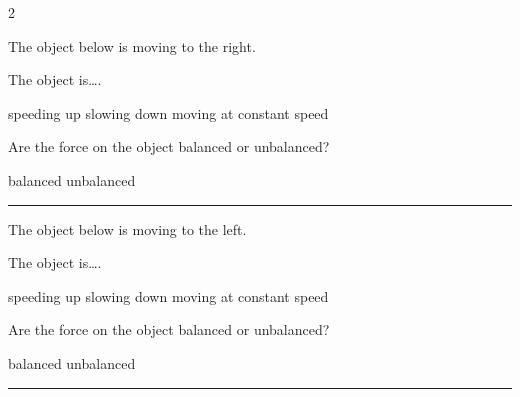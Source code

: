 \documentclass[answers]{exam}
\begin{document}
\begin{questions}
\begin{multicols*}{2}


\question \label{T7nyj}
The object below is moving to the right.

\begin{center}
\end{center}

The object is\dots .

\begin{randomizechoices}[norandomize]
    \choice speeding up
    \choice slowing down
    \correctchoice moving at constant speed 
\end{randomizechoices}

\question \label{lUN3c}
Are the force on the object balanced or unbalanced?

\begin{randomizechoices}[norandomize]
    \correctchoice balanced
    \choice unbalanced
\end{randomizechoices}

\bigskip
\hrule

\question \label{CrTRg}
The object below is moving to the left.


\begin{center}
\end{center}

The object is\dots .

\begin{randomizechoices}[norandomize]
    \choice speeding up
    \correctchoice slowing down
    \choice moving at constant speed 
\end{randomizechoices}

\question \label{TzyfS}
Are the force on the object balanced or unbalanced?

\begin{randomizechoices}[norandomize]
    \choice balanced
    \correctchoice unbalanced
\end{randomizechoices}

\bigskip
\hrule



\end{multicols*}
\end{questions}
\end{document}
